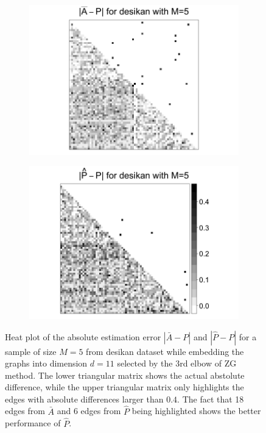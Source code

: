 \documentclass[a4paper]{article}
\begin{document}
\begin{figure}
\centering
\begin{subfigure}{.5\textwidth}
  \centering
  \includegraphics[width=1.2\linewidth]{Diff2_desikan_m5.png}
\end{subfigure}%
\begin{subfigure}{.5\textwidth}
  \centering
  \includegraphics[width=1.2\linewidth]{Diff3_desikan_m5.png}
\end{subfigure}
\caption{Heat plot of the absolute estimation error $|\bar{A} - P|$ and $|\hat{P} - P|$ for a sample of size $M=5$ from desikan dataset while embedding the graphs into dimension $d=11$ selected by the 3rd elbow of ZG method. The lower triangular matrix shows the actual abstolute difference, while the upper triangular matrix only highlights the edges with absolute differences larger than $0.4$. The fact that 18 edges from $\bar{A}$ and 6 edges from $\hat{P}$ being highlighted shows the better performance of $\hat{P}$.}
\label{fig:Diff_desikan_m5}
\end{figure}
\end{document}
